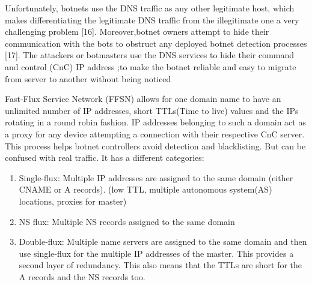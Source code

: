 Unfortunately, botnets use the DNS traffic as any other legitimate host, which makes differentiating the legitimate DNS traffic from the illegitimate one a very challenging problem [16]. Moreover,botnet owners attempt to hide their communication with the bots to obstruct any deployed botnet detection processes [17]. The attackers or botmasters use the DNS services to hide their command and control (CnC) IP address ;to make the botnet reliable and easy to migrate from server to another without being noticed

Fast-Flux Service Network (FFSN) allows for one domain name to have an unlimited number of IP addresses, short TTLs(Time to live) values and the IPs rotating in a round robin fashion. IP addresses belonging to such a domain act as a proxy for any device attempting a connection with their respective
CnC server. This process helps botnet controllers avoid detection and blacklisting. But can be confused with real traffic. It has a different categories:
\begin{enumerate}
\item Single-flux: Multiple IP addresses are assigned to the same domain (either CNAME or A records). (low TTL, multiple autonomous system(AS) locations, proxies for master)
\item NS flux: Multiple NS records assigned to the same domain
\item Double-flux: Multiple name servers are assigned to the same domain and then use single-flux for the multiple IP addresses of the master. This provides a second layer of redundancy. This also means that the TTLs are short for the A records and the NS records too.
\end{enumerate}

